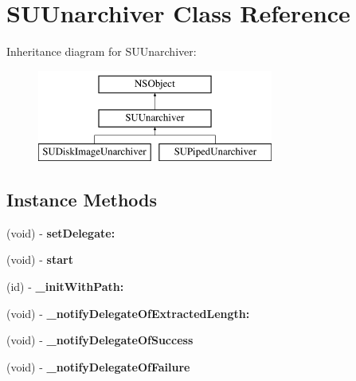 \hypertarget{interface_s_u_unarchiver}{}\section{S\+U\+Unarchiver Class Reference}
\label{interface_s_u_unarchiver}
Inheritance diagram for S\+U\+Unarchiver\+:\begin{figure}[H]
\begin{center}
\leavevmode
\includegraphics[height=3.000000cm]{interface_s_u_unarchiver}
\end{center}
\end{figure}
\subsection*{Instance Methods}
\begin{DoxyCompactItemize}
\item 
\mbox{\label{interface_s_u_unarchiver_a0701549d90d6a314937e405800b0e8fb}} 
(void) -\/ {\bfseries set\+Delegate\+:}
\item 
\mbox{\label{interface_s_u_unarchiver_aa57a365da975419af1ea073482ed5646}} 
(void) -\/ {\bfseries start}
\item 
\mbox{\label{interface_s_u_unarchiver_afaccfec95e57e943d018fa7fa27acbf0}} 
(id) -\/ {\bfseries \+\_\+init\+With\+Path\+:}
\item 
\mbox{\label{interface_s_u_unarchiver_a49c191fa54c4b2473e96bf1ce9097176}} 
(void) -\/ {\bfseries \+\_\+notify\+Delegate\+Of\+Extracted\+Length\+:}
\item 
\mbox{\label{interface_s_u_unarchiver_a91dfacee19d21e16c4c4169f497fd7e3}} 
(void) -\/ {\bfseries \+\_\+notify\+Delegate\+Of\+Success}
\item 
\mbox{\label{interface_s_u_unarchiver_ad0119bd2f95bfacd899d552989427374}} 
(void) -\/ {\bfseries \+\_\+notify\+Delegate\+Of\+Failure}
\end{DoxyCompactItemize}
